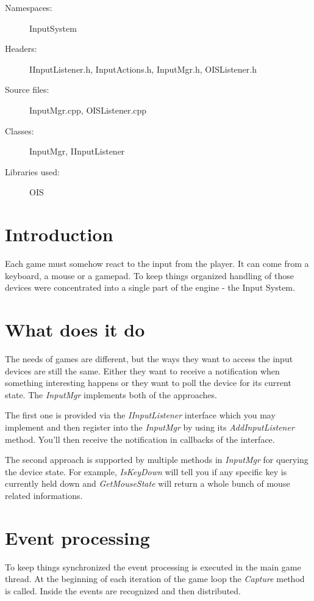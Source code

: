 \begin{description}
  \item[Namespaces:] InputSystem
  \item[Headers:] IInputListener.h, InputActions.h, InputMgr.h, OISListener.h
  \item[Source files:] InputMgr.cpp, OISListener.cpp
  \item[Classes:] InputMgr, IInputListener
  \item[Libraries used:] OIS
\end{description}

\section{Introduction}
Each game must somehow react to the input from the player. It can come from a keyboard, a mouse or a gamepad. To keep things organized handling of those devices were concentrated into a single part of the engine - the Input System.


\section{What does it do}
The needs of games are different, but the ways they want to access the input devices are still the same. Either they want to receive a notification when something interesting happens or they want to poll the device for its current state. The \emph{InputMgr} implements both of the approaches.

The first one is provided via the \emph{IInputListener} interface which you may implement and then register into the \emph{InputMgr} by using its \emph{AddInputListener} method. You'll then receive the notification in callbacks of the interface.

The second approach is supported by multiple methods in \emph{InputMgr} for querying the device state. For example, \emph{IsKeyDown} will tell you if any specific key is currently held down and \emph{GetMouseState} will return a whole bunch of mouse related informations.


\section{Event processing}
To keep things synchronized the event processing is executed in the main game thread. At the beginning of each iteration of the game loop the \emph{Capture} method is called. Inside the events are recognized and then distributed.



